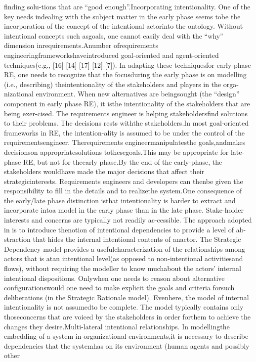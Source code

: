 ﬁnding solu-tions that are “good enough”.Incorporating intentionality. One of the key needs indealing with the subject matter in the early phase seems tobe the incorporation of the concept of the intentional actorinto the ontology. Without intentional concepts such asgoals, one cannot easily deal with the “why” dimension inrequirements.Anumber ofrequirements engineeringframeworkshaveintroduced goal-oriented and agent-oriented techniques(e.g., [16] [14] [17] [12] [7]). In adapting these techniquesfor early-phase RE, one needs to recognize that the focusduring the early phase is on modelling (i.e., describing) theintentionality of the stakeholders and players in the orga-nizational environment. When new alternatives are beingsought (the “design” component in early phase RE), it isthe intentionality of the stakeholders that are being exer-cised. The requirements engineer is helping stakeholdersﬁnd solutions to their problems. The decisions rests withthe stakeholders.In most goal-oriented frameworks in RE, the intention-ality is assumed to be under the control of the requirementsengineer. Therequirements engineermanipulatesthe goals,andmakes decisionson appropriatesolutions tothesegoals.This may be appropriate for late-phase RE, but not for theearly phase.By the end of the early-phase, the stakeholders wouldhave made the major decisions that affect their strategicinterests. Requirements engineers and developers can thenbe given the responsibility to ﬁll in the details and to realizethe system.One consequence of the early/late phase distinction isthat intentionality is harder to extract and incorporate intoa model in the early phase than in the late phase. Stake-holder interests and concerns are typically not readily ac-cessible. The approach adopted in is to introduce thenotion of intentional dependencies to provide a level of ab-straction that hides the internal intentional contents of anactor. The Strategic Dependency model provides a usefulcharacterization of the relationships among actors that is atan intentional level(as opposed to non-intentional activitiesand ﬂows), without requiring the modeller to know muchabout the actors’ internal intentional dispositions. Onlywhen one needs to reason about alternative conﬁgurationswould one need to make explicit the goals and criteria forsuch deliberations (in the Strategic Rationale model). Evenhere, the model of internal intentionality is not assumedto be complete. The model typically contains only thoseconcerns that are voiced by the stakeholders in order forthem to achieve the changes they desire.Multi-lateral intentional relationships. In modellingthe embedding of a system in organizational environments,it is necessary to describe dependencies that the systemhas on its environment (human agents and possibly other
